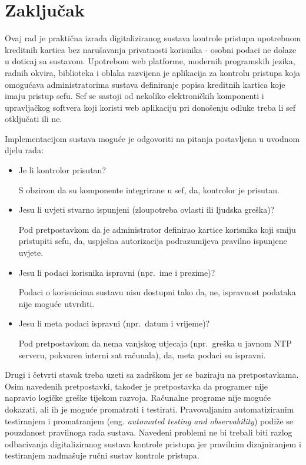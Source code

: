 \chapter{Zaključak}

Ovaj rad je praktična izrada digitaliziranog sustava kontrole pristupa upotrebnom kreditnih kartica bez narušavanja
privatnosti korisnika - osobni podaci ne dolaze u doticaj sa sustavom.
Upotrebom web platforme, modernih programskih jezika, radnih okvira, biblioteka i oblaka razvijena je aplikacija
za kontrolu pristupa koja omogućava administratorima sustava definiranje popisa kreditnih kartica koje imaju pristup sefu.
Sef se sastoji od nekoliko elektroničkih komponenti i upravljačkog softvera koji koristi web aplikaciju pri
donošenju odluke treba li sef otključati ili ne.

Implementacijom sustava moguće je odgovoriti na pitanja postavljena u uvodnom djelu rada:

\begin{itemize}
    \item Je li kontrolor prisutan?

    S obzirom da su komponente integrirane u sef, da, kontrolor je prisutan.

    \item Jesu li uvjeti stvarno ispunjeni (zloupotreba ovlasti ili ljudska greška)?

    Pod pretpostavkom da je administrator definirao kartice korisnika koji smiju pristupiti sefu, da,
    uspješna autorizacija podrazumijeva pravilno ispunjene uvjete.

    \item Jesu li podaci korisnika ispravni (npr.\ ime i prezime)?

    Podaci o korisnicima sustavu nisu dostupni tako da, ne, ispravnost podataka nije moguće utvrditi.

    \item Jesu li meta podaci ispravni (npr.\ datum i vrijeme)?

    Pod pretpostavkom da nema vanjskog utjecaja (npr.\ greška u javnom NTP serveru, pokvaren interni sat računala), da,
    meta podaci su ispravni.
\end{itemize}

Drugi i četvrti stavak treba uzeti sa zadrškom jer se baziraju na pretpostavkama.
Osim navedenih pretpostavki, također je pretpostavka da programer nije napravio logičke greške tijekom razvoja.
Računalne programe nije moguće dokazati, ali ih je moguće promatrati i testirati.
Pravovaljanim automatiziranim testiranjem i promatranjem (eng. \textit{automated testing and observability}) podiže se
pouzdanost pravilnoga rada sustava.
Navedeni problemi ne bi trebali biti razlog odbacivanja digitaliziranog sustava kontrole pristupa jer
pravilnim dizajniranjem i testiranjem nadmašuje ručni sustav kontrole pristupa.
